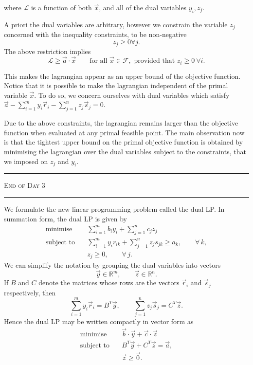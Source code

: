 where $\mathcal{L}$ is a function of both $\vec{x}$, and all of the dual variables $y_i, z_j$.

A priori the dual variables are arbitrary, however we constrain the variable $z_j$ concerned with the inequality constraints, to be non-negative
$$z_j \ge 0  \forall  j.$$
The above restriction implies
\[
    \mathcal{L} \ge \vec{a}\cdot\vec{x}
    \qquad
    \text{for all } \vec{x} \in \mathcal{F},
    \text{ provided that } z_i \ge 0 \  \forall  i.
\]

This makes the lagrangian appear as an upper bound of the objective function.
Notice that it is possible to make the lagrangian independent of the primal variable $\vec{x}$.
To do so, we concern ourselves with dual variables which satisfy
$\vec{a}
    -
    \sum_{i=1}^{m} y_i \vec{r}_i
    -
    \sum_{j=1}^{n} z_j \vec{s}_j = 0.$

Due to the above constraints, the lagrangian remains larger than the objective function when evaluated at any primal feasible point.
The main observation now is that the tightest upper bound on the primal objective function is obtained by minimising the lagrangian over the dual variables subject to the constraints, that we imposed on $z_j$ and $y_i$.

\begin{center}
    {\color{quantumdeep}
        \rule{\linewidth}{0.6pt}

        \scshape\Large End of Day 3

        \rule{\linewidth}{0.6pt}}
\end{center}

We formulate the new linear programming problem called the dual LP.
In summation form, the dual LP is given by
\[
    \begin{aligned}
        \text{minimise} \quad   & \sum_{i=1}^{m} b_i y_i + \sum_{j=1}^{n} c_j z_j                                     \\[0.5em]
        \text{subject to} \quad & \sum_{i=1}^{m} y_i r_{ik} + \sum_{j=1}^{n} z_j s_{jk} \geq a_k, \qquad \forall\, k, \\[0.5em]
                                & z_j \ge 0, \qquad \forall\, j.
    \end{aligned}
\]
We can simplify the notation by grouping the dual variables into vectors
\[
    \vec{y} \in \mathbb{R}^m, \qquad \vec{z} \in \mathbb{R}^n.
\]
If $B$ and $C$ denote the matrices whose rows are the vectors $\vec{r}_i$ and $\vec{s}_j$ respectively, then
\[
    \sum_{i=1}^{m} y_i \vec{r}_i = B^T \vec{y}, \qquad \sum_{j=1}^{n} z_j \vec{s}_j = C^T \vec{z}.
\]
Hence the dual LP may be written compactly in vector form as
\[
    \begin{aligned}
        \text{minimise} \quad   & \vec{b} \cdot \vec{y} + \vec{c} \cdot \vec{z} \\[0.5em]
        \text{subject to} \quad & B^T \vec{y} + C^T \vec{z} = \vec{a},          \\[0.5em]
                                & \vec{z} \ge \vec{0}.
    \end{aligned}
\]

